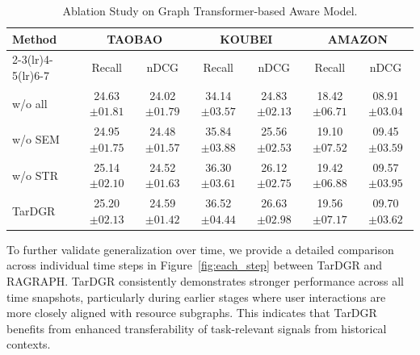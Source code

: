 \documentclass[letterpaper]{article} %
\begin{document}
\begin{table}[ht]
\centering
\begin{tabular}{lcccccc}
        \toprule
        \multirow{2}{*}{Method} & \multicolumn{2}{c}{TAOBAO} & \multicolumn{2}{c}{KOUBEI} & \multicolumn{2}{c}{AMAZON} \\
        \cmidrule(lr){2-3}\cmidrule(lr){4-5}\cmidrule(lr){6-7}
        ~ & Recall & nDCG & Recall & nDCG & Recall & nDCG \\
        \midrule
        w/o all & 24.63$\scriptstyle{\pm 01.81}$ & 24.02$\scriptstyle{\pm 01.79}$ & 34.14$\scriptstyle{\pm 03.57}$ & 24.83$\scriptstyle{\pm 02.13}$ & 18.42$\scriptstyle{\pm 06.71}$ & 08.91$\scriptstyle{\pm 03.04}$ \\
        w/o SEM & 24.95$\scriptstyle{\pm 01.75}$ & 24.48$\scriptstyle{\pm 01.57}$ & 35.84$\scriptstyle{\pm 03.88}$ & 25.56$\scriptstyle{\pm 02.53}$ & 19.10$\scriptstyle{\pm 07.52}$ & 09.45$\scriptstyle{\pm 03.59}$ \\
        w/o STR & 25.14$\scriptstyle{\pm 02.10}$ & 24.52$\scriptstyle{\pm 01.63}$ & 36.30$\scriptstyle{\pm 03.61}$ & 26.12$\scriptstyle{\pm 02.75}$ & 19.42$\scriptstyle{\pm 06.88}$ & 09.57$\scriptstyle{\pm 03.95}$ \\
        TarDGR & 25.20$\scriptstyle{\pm 02.13}$ & 24.59$\scriptstyle{\pm 01.42}$ & 36.52$\scriptstyle{\pm 04.44}$ & 26.63$\scriptstyle{\pm 02.98}$ & 19.56$\scriptstyle{\pm 07.17}$ & 09.70$\scriptstyle{\pm 03.62}$ \\
        \bottomrule
\end{tabular}
\caption{Ablation Study on Graph Transformer-based Aware Model.}
\label{tab:ab_study}
\vspace{-0.3cm}
\end{table}


To further validate generalization over time, we provide a detailed comparison across individual time steps in Figure~\ref{fig:each_step} between TarDGR and RAGRAPH. TarDGR consistently demonstrates stronger performance across all time snapshots, particularly during earlier stages where user interactions are more closely aligned with resource subgraphs. This indicates that TarDGR benefits from enhanced transferability of task-relevant signals from historical contexts. 
\end{document}
